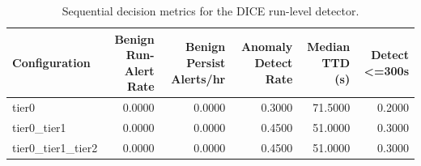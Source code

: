 \begin{table}[t]
\centering
\caption{Sequential decision metrics for the DICE run-level detector.}
\label{tab:dice_sequential_metrics}
\footnotesize
\begin{tabular}{lrrrrr}
\toprule
Configuration & Benign Run-Alert Rate & Benign Persist Alerts/hr & Anomaly Detect Rate & Median TTD (s) & Detect <=300s \\
\midrule
tier0 & 0.0000 & 0.0000 & 0.3000 & 71.5000 & 0.2000 \\
tier0_tier1 & 0.0000 & 0.0000 & 0.4500 & 51.0000 & 0.3000 \\
tier0_tier1_tier2 & 0.0000 & 0.0000 & 0.4500 & 51.0000 & 0.3000 \\
\bottomrule
\end{tabular}

\end{table}
